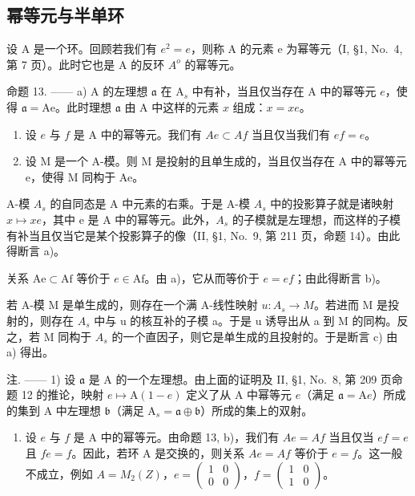 \subsection{幂等元与半单环}

设 A 是一个环。回顾若我们有 \(e^{2} = e\)，则称 A 的元素 e 为幂等元（I, §1, No.~4, 第 7 页）。此时它也是 A 的反环 \(A^{o}\) 的幂等元。

命题 13. —— a) A 的左理想 \(\mathfrak{a}\) 在 \(\mathrm{A}_s\) 中有补，当且仅当存在 A 中的幂等元 \(e\)，使得 \(\mathfrak{a} = \mathrm{Ae}\)。此时理想 \(\mathfrak{a}\) 由 A 中这样的元素 \(x\) 组成：\(x = xe\)。

\begin{enumerate}
\def\labelenumi{\alph{enumi})}
\setcounter{enumi}{1}
\item
  设 \(e\) 与 \(f\) 是 A 中的幂等元。我们有 \(Ae \subset Af\) 当且仅当我们有 \(ef = e\)。
\item
  设 M 是一个 A-模。则 M 是投射的且单生成的，当且仅当存在 A 中的幂等元 e，使得 M 同构于 Ae。
\end{enumerate}

A-模 \(A_{s}\) 的自同态是 A 中元素的右乘。于是 A-模 \(A_{s}\) 中的投影算子就是诸映射 \(x \mapsto xe\)，其中 e 是 A 中的幂等元。此外，\(A_{s}\) 的子模就是左理想，而这样的子模有补当且仅当它是某个投影算子的像（II, §1, No.~9, 第 211 页，命题 14）。由此得断言 a)。

关系 \(\mathrm{Ae} \subset \mathrm{Af}\) 等价于 \(e \in \mathrm{Af}\)。由 a)，它从而等价于 \(e = ef\)；由此得断言 b)。

若 A-模 M 是单生成的，则存在一个满 A-线性映射 \(u: A_{s} \to M\)。若进而 M 是投射的，则存在 \(A_{s}\) 中与 u 的核互补的子模 a。于是 u 诱导出从 a 到 M 的同构。反之，若 M 同构于 \(A_{s}\) 的一个直因子，则它是单生成的且投射的。于是断言 c) 由 a) 得出。

注. —— 1) 设 \(\mathfrak{a}\) 是 A 的一个左理想。由上面的证明及 II, §1, No.~8, 第 209 页命题 12 的推论，映射 \(e \mapsto \mathrm{A}(1 - e)\) 定义了从 A 中幂等元 \(e\)（满足 \(\mathfrak{a} = \mathrm{A}e\)）所成的集到 A 中左理想 \(\mathfrak{b}\)（满足 \(\mathrm{A}_s = \mathfrak{a} \oplus \mathfrak{b}\)）所成的集上的双射。

\begin{enumerate}
\def\labelenumi{\arabic{enumi})}
\setcounter{enumi}{1}
\tightlist
\item
  设 \(e\) 与 \(f\) 是 A 中的幂等元。由命题 13, b)，我们有 \(Ae = Af\) 当且仅当 \(ef = e\) 且 \(fe = f\)。因此，若环 A 是交换的，则关系 \(Ae = Af\) 等价于 \(e = f\)。这一般不成立，例如 \(A = M_2(Z)\)，\(e = \begin{pmatrix} 1 & 0 \\ 0 & 0 \end{pmatrix}\)，\(f = \begin{pmatrix} 1 & 0 \\ 1 & 0 \end{pmatrix}\)。
\end{enumerate}

